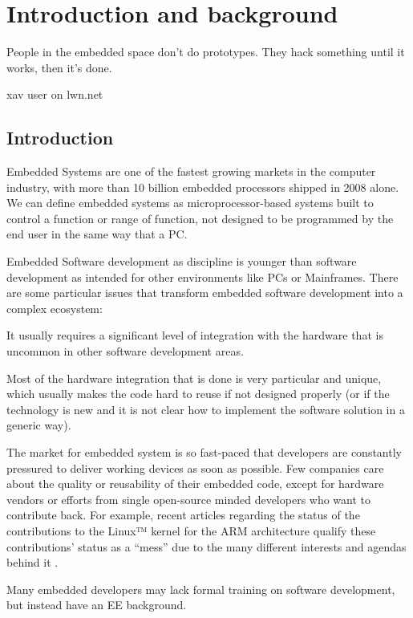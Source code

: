 \chapter{Introduction and background}
\epigraph{People in the embedded space don't do prototypes. They hack something until it works, then it's done.}{xav user on lwn.net}

\section{Introduction}
Embedded Systems are one of the fastest growing markets in the computer industry, with more than 10 billion embedded processors shipped in 2008 alone\citep{Clarke:2009uq}. We can define embedded systems as microprocessor-based systems built to control a function or range of function, not designed to be programmed by the end user in the same way that a \ac{PC}\cite{heath2003embedded}.

Embedded Software development as discipline is younger than software development as intended for other environments like \acp{PC} or Mainframes. There are some particular issues that transform embedded software development into a complex ecosystem:
\begin{itemize*}
\item It usually requires a significant level of integration with the hardware that is uncommon in other software development areas.
\item Most of the hardware integration that is done is very particular and unique, which usually makes the code hard to reuse if not designed properly (or if the technology is new and it is not clear how to implement the software solution in a generic way).
\item The market for embedded system is so fast-paced that developers are constantly pressured to deliver working devices as soon as possible. Few companies care about the quality or reusability of their embedded code, except for hardware vendors or efforts from single open-source minded developers who want to contribute back. For example, recent articles regarding the status of the contributions to the Linux™ kernel for the \ac{ARM} architecture qualify these contributions' status as a  ``mess'' due to the many different interests and agendas behind it \cite{Proffitt:2011fk}.
\item Many embedded developers may lack formal training on software development, but instead have an \ac{EE} background.
\end{itemize*}


